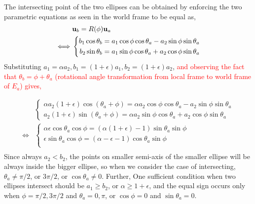 \documentclass{article}
\begin{document}
The intersecting point of the two ellipses can be obtained by enforcing the two parametric equations as seen in the world frame to be equal as,
\begin{equation}
\begin{aligned}
& {\bf u}_b = R(\phi) {\bf u}_a \\
\iff & \left\{
\begin{aligned}
b_1 \cos\theta_b = a_1\cos\phi \cos\theta_a - a_2\sin\phi \sin\theta_a\\
b_2 \sin\theta_b = a_1\sin\phi \cos\theta_a + a_2\cos\phi \sin\theta_a
\end{aligned}
\right.\\
\end{aligned}
\end{equation}
Substituting $a_1 = \alpha a_2, b_1 = (1+\epsilon)a_1, b_2 = (1+\epsilon)a_2$, \textcolor{red}{and observing the fact that $\theta_b = \phi + \theta_a$ (rotational angle transformation from local frame to world frame of $E_a$) gives,}

\begin{equation}
\begin{aligned}
& \left\{
\begin{aligned}
\alpha a_2 (1+\epsilon) \cos(\theta_a + \phi) = \alpha a_2 \cos\phi \cos\theta_a - a_2\sin\phi \sin\theta_a\\
a_2 (1+\epsilon) \sin(\theta_a + \phi) = \alpha a_2 \sin\phi \cos\theta_a + a_2\cos\phi \sin\theta_a
\end{aligned}
\right. \\
\iff & 
\left\{
\begin{aligned}
\alpha \epsilon \cos\theta_a \cos\phi = (\alpha(1+\epsilon) - 1) \sin\theta_a \sin\phi \\
\epsilon \sin\theta_a \cos\phi = (\alpha - \epsilon - 1) \cos\theta_a \sin\phi \\
\end{aligned}
\right. \\
\end{aligned}
\end{equation}
Since always $a_2 < b_2$, the points on smaller semi-axis of the smaller ellipse will be always inside the bigger ellipse, so when we consider the case of intersecting, $\theta_a \neq \pi/2$, or $3\pi/2$, or $\cos\theta_a \neq 0$. Further, One sufficient condition when two ellipses intersect should be $a_1 \geq b_2$, or $\alpha \geq 1+\epsilon$, and the equal sign occurs only when $\phi = \pi/2, 3\pi/2$ and $\theta_a = 0, \pi$, or $\cos\phi = 0$ and $\sin\theta_a = 0$.
\end{document}
